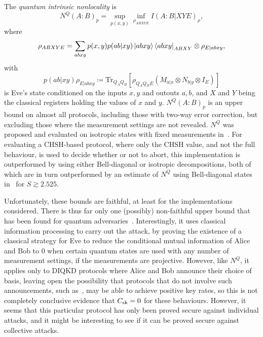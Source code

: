 \documentclass[10pt, a4paper]{article}
\numberwithin{equation}{section} %
\theoremstyle{definition}
\theoremstyle{plain}
\newcommand{\?}{\mathrel{?}} %
\newcommand{\Tr}{\mathrm{Tr}} %
\newcommand{\sk}{\rm sk}
\begin{document}
      The \emph{quantum intrinsic nonlocality} is~\cite{DIQKD_Limits}
      \begin{equation}
        N^Q{(A:B)}_p = \sup_{p(x,y)} \inf_{\rho_{ABXYE}} I{(A:B|XYE)}_{\rho},
      \end{equation}
      where
      \begin{align}
        \rho_{ABXYE} = \sum_{abxy} p(x,y) p(ab|xy) \ket{abxy}\bra{abxy}_{ABXY} \otimes \rho_{E|abxy},
      \end{align}
      with
      \begin{equation}
        p(ab|xy) \rho_{E|abxy} \coloneqq \Tr_{Q_A Q_B}\left[\rho_{Q_A Q_B E} \left(M_{a|x} \otimes N_{b|y} \otimes I_{E}\right) \right]
      \end{equation}
      is Eve's state conditioned on the inputs \(x,y\) and outouts \(a,b\), and \(X\) and \(Y\) being the classical registers holding the values of \(x\) and \(y\). \(N^Q{(A:B)}_p\) is an upper bound on almost all protocols, including those with two-way error correction, but excluding those where the measurement settings are not revealed. \(N^Q\) was proposed and evaluated on isotropic states with fixed measurements in~\cite{DIQKD_Limits}. For evaluating a CHSH-based protocol, where only the CHSH value, and not the full behaviour, is used to decide whether or not to abort, this implementation is outperformed by  using either Bell-diagonal or isotropic decompositions, both of which are in turn outperformed by an estimate of \(N^Q\) using Bell-diagonal states in~\cite[Appendix B]{RevisedPeres} for \(S \gtrsim 2.525\).

      Unfortunately, these bounds are faithful, at least for the implementations considered. There is thus far only one (possibly) non-faithful upper bound that has been found for quantum adversaries~\cite{NotSufficient}. Interestingly, it uses classical information processing to carry out the attack, by proving the existence of a classical strategy for Eve to reduce the conditional mutual information of Alice and Bob to 0 when certain quantum states are used with any number of measurement settings, if the measurements are projective. However, like \(N^Q\), it applies only to DIQKD protocols where Alice and Bob announce their choice of basis, leaving open the possibility that protocols that do not involve such announcements, such as~\cite{NonstandardProtocol}, may be able to achieve positive key rates, so this is not completely conclusive evidence that \(C_{\sk} = 0\) for these behaviours. However, it seems that this particular protocol has only been proved secure against individual attacks, and it might be interesting to see if it can be proved secure against collective attacks.
\end{document}
